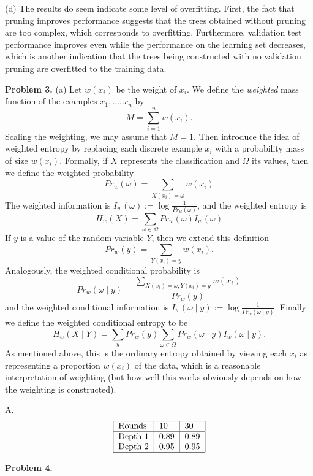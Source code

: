 \documentclass[12pt]{amsart}
\theoremstyle{remark}
\begin{document}
(d) The results do seem indicate some level of overfitting. First, the fact that pruning improves performance suggests that the trees obtained without pruning are too complex, which corresponds to overfitting. Furthermore, validation test performance improves even while the performance on the learning set decreases, which is another indication that the trees being constructed with no validation pruning are overfitted to the training data. 
\newpage

\noindent \textbf{Problem 3.} (a)  Let $w(x_i)$ be the weight of $x_i$. We define the \emph{weighted} mass function of the examples $x_1, \ldots, x_n$ by 
\[
M = \sum_{i=1}^n w(x_i). 
\]
Scaling the weighting, we may assume that $M=1$. Then introduce the idea of weighted entropy by replacing each discrete example $x_i$ with a probability mass of size $w(x_i)$. Formally, if $X$ represents the classification and $\Omega$ its values, then we define the weighted probability 
\[
Pr_w(\omega) = \sum_{X(x_i) = \omega} w(x_i) 
\]
The weighted information is $I_w(\omega)  := \log \frac{1}{Pr_w(\omega)}$, and the weighted entropy is 
\[
H_w(X) = \sum_{\omega \in \Omega} Pr_w(\omega) I_w(\omega)
\]
If $y$ is a value of the random variable $Y$, then we extend this definition 
\[
Pr_w(y) = \sum_{Y(x_i) = y} w(x_i).
\]
Analogously, the weighted conditional probability is 
\[
Pr_w(\omega \mid y) =\frac{ \sum_{X(x_i) = \omega, Y(x_i) = y} w(x_i)}{Pr_w(y)}
\]
and the weighted conditional information is $I_w(\omega \mid y ) := \log \frac{1}{Pr_w(\omega \mid y)}$. 
Finally we define the weighted conditional entropy to be  
\[
H_w(X \mid Y) = \sum_y Pr_w(y) \sum_{\omega \in \Omega} Pr_w(\omega \mid y) I_w(\omega \mid y).
\]
As mentioned above, this is the ordinary entropy obtained by viewing each $x_i$ as representing a proportion $w(x_i)$ of the data, which is a reasonable interpretation of weighting (but how well this works obviously depends on how the weighting is constructed). 

A. 
\[
\begin{tabular}{|l|l|l|l|}
\hline
 Rounds & 10 & 30 \\
\hline
Depth 1& 0.89 &  0.89 \\
Depth 2 & 0.95 &  0.95\\
\hline
\end{tabular}
\]
\newpage

\noindent \textbf{Problem 4.} 
\end{document}
